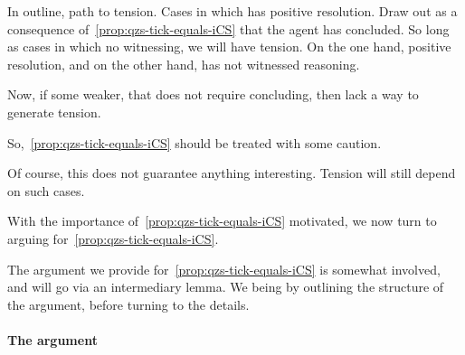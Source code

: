 \begin{note}
  In outline, path to tension.
  Cases in which \qzs{} has positive resolution.
  Draw out as a consequence of~\autoref{prop:qzs-tick-equals-iCS} that the agent has concluded.
  So long as cases in which no witnessing, we will have tension.
  On the one hand, positive resolution, and on the other hand, has not witnessed reasoning.

  Now, if some weaker, that does not require concluding, then lack a way to generate tension.

  So,~\autoref{prop:qzs-tick-equals-iCS} should be treated with some caution.

  Of course, this does not guarantee anything interesting.
  Tension will still depend on such cases.
\end{note}

\begin{note}
  With the importance of~\autoref{prop:qzs-tick-equals-iCS} motivated, we now turn to arguing for~\autoref{prop:qzs-tick-equals-iCS}.

  The argument we provide for~\autoref{prop:qzs-tick-equals-iCS} is somewhat involved, and will go via an intermediary lemma.
  We being by outlining the structure of the argument, before turning to the details.
\end{note}

\paragraph*{The argument}

